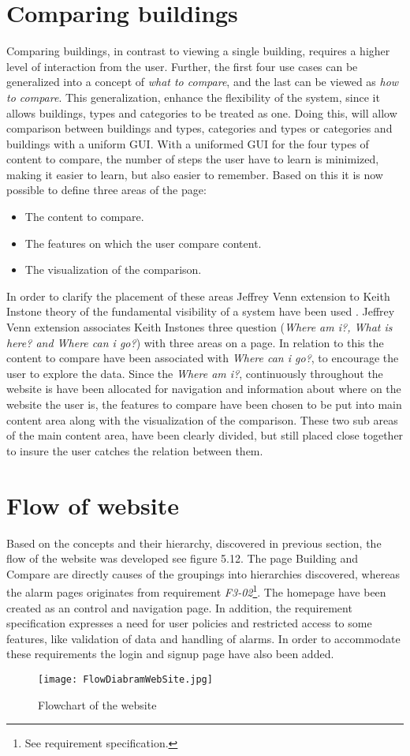 \section*{Comparing buildings}
Comparing buildings, in contrast to viewing a single building, requires a higher level of interaction from the user. Further, the first four use cases can be generalized into a concept of \emph{what to compare}, and the last can be viewed as \emph{how to compare}. This generalization, enhance the flexibility of the system, since it allows buildings, types and categories to be treated as one. Doing this, will allow comparison between buildings and types, categories and types or categories and buildings with a uniform GUI. With a uniformed GUI for the four types of content to compare, the number of steps the user have to learn is minimized, making it easier to learn, but also easier to remember. Based on this it is now possible to define three areas of the page:
\begin{itemize}
\item The content to compare.
\item The features on which the user compare content.
\item The visualization of the comparison.
\end{itemize}
In order to clarify the placement of these areas Jeffrey Venn extension to Keith Instone theory of the fundamental visibility of a system have been used \cite{interaction}. Jeffrey Venn extension associates Keith Instones three question (\emph{Where am i?, What is here? and Where can i go?}) with three areas on a page. In relation to this the content to compare have been associated with \emph{Where can i go?}, to encourage the user to explore the data. Since the \emph{Where am i?}, continuously throughout the website is have been allocated for navigation and information about where on the website the user is, the features to compare have been chosen to be put into main content area along with the visualization of the comparison. These two sub areas of the main content area, have been clearly divided, but still placed close together to insure the user catches the relation between them.
\section*{Flow of website}
Based on the concepts and their hierarchy, discovered in previous section, the flow of the website was developed see figure 5.12. The page Building and Compare are directly causes of the groupings into hierarchies discovered, whereas the alarm pages originates from requirement \emph{F3-02}\footnote{See requirement specification.}. The homepage have been created as an control and navigation page. In addition, the requirement specification expresses a need for user policies and restricted access to some features, like validation of data and handling of alarms. In order to accommodate these requirements the login and signup page have also been added.
\begin{figure}
\begin{center}
\texttt{[image: FlowDiabramWebSite.jpg]}
\end{center}
\caption{Flowchart of the website}
\end{figure}
